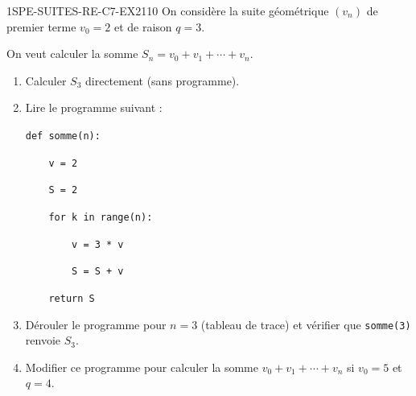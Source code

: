 \begin{exercice}{1SPE-SUITES-RE-C7-EX2}{1}{10}
On considère la suite géométrique $(v_n)$ de premier terme $v_0 = 2$ et de raison $q = 3$.

On veut calculer la somme $S_n = v_0 + v_1 + \cdots + v_n$.

\begin{enumerate}
  \item Calculer $S_3$ directement (sans programme).
  \item Lire le programme suivant :

\medskip
\verb|def somme(n):|

\verb|    v = 2|

\verb|    S = 2|

\verb|    for k in range(n):|

\verb|        v = 3 * v|

\verb|        S = S + v|

\verb|    return S|

  \item Dérouler le programme pour $n = 3$ (tableau de trace) et vérifier que \texttt{somme(3)} renvoie $S_3$.
  \item Modifier ce programme pour calculer la somme $v_0 + v_1 + \cdots + v_n$ si $v_0 = 5$ et $q = 4$.
\end{enumerate}
\end{exercice}



